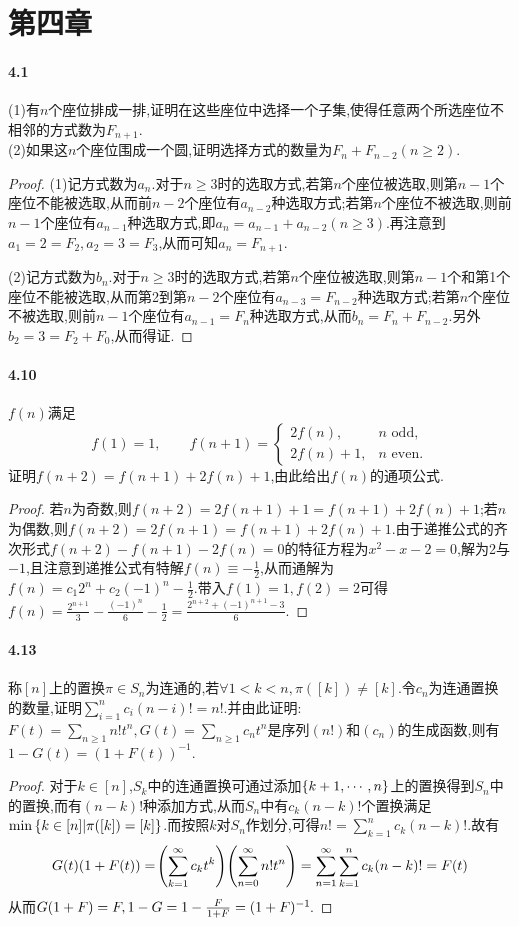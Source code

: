 \documentclass{article}
\begin{document}
\section{第四章}
\paragraph{4.1}(1)有$n$个座位排成一排,证明在这些座位中选择一个子集,使得任意两个所选座位不相邻的方式数为$F_{n+1}$.\\
(2)如果这$n$个座位围成一个圆,证明选择方式的数量为$F_n+F_{n-2} (n\geq 2)$.
\begin{proof}
    (1)记方式数为$a_n$.对于$n\geq 3$时的选取方式,若第$n$个座位被选取,则第$n-1$个座位不能被选取,从而前$n-2$个座位有$a_{n-2}$种选取方式;若第$n$个座位不被选取,则前$n-1$个座位有$a_{n-1}$种选取方式,即$a_n=a_{n-1}+a_{n-2}(n\geq 3)$.再注意到$a_1=2=F_2, a_2=3=F_3$,从而可知$a_n=F_{n+1}$.

    (2)记方式数为$b_n$.对于$n\geq 3$时的选取方式,若第$n$个座位被选取,则第$n-1$个和第1个座位不能被选取,从而第2到第$n-2$个座位有$a_{n-3}=F_{n-2}$种选取方式;若第$n$个座位不被选取,则前$n-1$个座位有$a_{n-1}=F_n$种选取方式,从而$b_n=F_n+F_{n-2}$.另外$b_2=3=F_2+F_0$,从而得证.
\end{proof}

\paragraph{4.10}$f(n)$满足
$$f(1)=1,\qquad f(n+1)=\begin{cases} 
    2f(n), & n \text{ odd}, \\ 
    2f(n)+1, & n \text{ even}.
\end{cases}$$
证明$f(n+2)=f(n+1)+2f(n)+1$,由此给出$f(n)$的通项公式.
\begin{proof}
    若$n$为奇数,则$f(n+2)=2f(n+1)+1=f(n+1)+2f(n)+1$;若$n$为偶数,则$f(n+2)=2f(n+1)=f(n+1)+2f(n)+1$.由于递推公式的齐次形式$f(n+2)-f(n+1)-2f(n)=0$的特征方程为$x^2-x-2=0$,解为2与$-1$,且注意到递推公式有特解$f(n)\equiv -\frac{1}{2}$,从而通解为$f(n)=c_1 2^n+c_2 (-1)^n-\frac{1}{2}$.带入$f(1)=1,f(2)=2$可得$f(n)=\frac{2^{n+1}}{3}-\frac{(-1)^n}{6}-\frac{1}{2}=\frac{2^{n+2}+(-1)^{n+1}-3}{6}$.
\end{proof}

\paragraph{4.13}称$[n]$上的置换$\pi\in S_n$为连通的,若$\forall 1<k<n, \pi([k])\neq [k]$.令$c_n$为连通置换的数量,证明$\sum_{i=1}^n c_i(n-i)!=n!$.并由此证明:$F(t)=\sum_{n\geq 1}n! t^n,G(t)=\sum_{n\geq 1}c_n t^n$是序列$(n!)$和$(c_n)$的生成函数,则有$1-G(t)=(1+F(t))^{-1}$.
\begin{proof}
    对于$k\in [n]$,$S_k$中的连通置换可通过添加$\left\{k+1,\cdots,n\right\}$上的置换得到$S_n$中的置换,而有$(n-k)!$种添加方式,从而$S_n$中有$c_k(n-k)!$个置换满足$\min\left\{k\in [n]|\pi([k])=[k]\right\}$.而按照$k$对$S_n$作划分,可得$n!=\sum_{k=1}^{n}c_k(n-k)!$.故有
    $$G(t)(1+F(t))=\!\left(\sum_{k=1}^{\infty}c_k t^k\right)\!\left(\sum_{n=0}^{\infty}n! t^n\right)=\sum_{n=1}^{\infty}\sum_{k=1}^{n}c_k(n-k)!=F(t)$$
    从而$G(1+F)=F, 1-G=1-\frac{F}{1+F}=(1+F)^{-1}\!$.
\end{proof}
\end{document}
